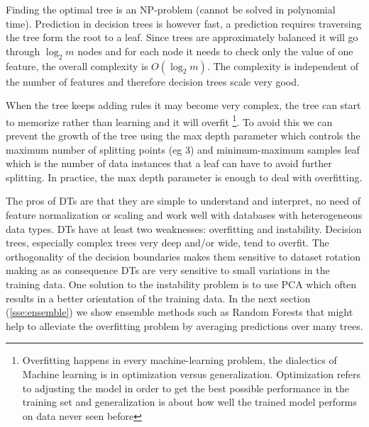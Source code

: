 \documentclass[11pt]{article}
\theoremstyle{definition}
\theoremstyle{remark}
\begin{document}
Finding the optimal tree is an NP-problem (cannot be solved in polynomial time). Prediction in decision trees is however fast, a prediction requires traversing the tree form the root to a leaf. Since trees are approximately balanced it will go through $\log_{2}m$ nodes and for each node it needs to check only the value of one feature, the overall complexity is $O(\log_{2}m)$. The complexity is independent of the number of features and therefore decision trees scale very good.

When the tree keeps adding rules it may become very complex, the tree can start to memorize rather than learning  and it will overfit \footnote{Overfitting happens in every machine-learning problem, the dialectics of Machine learning is in optimization versus generalization. Optimization refers to adjusting the model in order to get the best possible performance in the training set and generalization is about how well the trained model performs on data never seen before}. To avoid this we can prevent the growth of the tree using the max depth parameter which controls the maximum number of splitting points (eg 3) and minimum-maximum samples leaf which is the number of data instances that a leaf can have to avoid further splitting. In practice, the max depth parameter is enough to deal with overfitting.

The pros of DTs are that they are simple to understand and interpret, no need of feature normalization or scaling and work well with databases with heterogeneous data types. 
DTs have at least two weaknesses: overfitting and instability. Decision trees, especially complex trees very deep and/or wide, tend to overfit. The orthogonality of the decision boundaries makes them sensitive to dataset rotation making as as consequence DTs are very sensitive to small variations in the training data.
One solution to the instability problem is to use PCA which often results in a better orientation of the training data. In the next section (\ref{sse:ensemble}) we show ensemble methods such as Random Forests that might help to alleviate the overfitting problem by averaging predictions over many trees.
\end{document}
